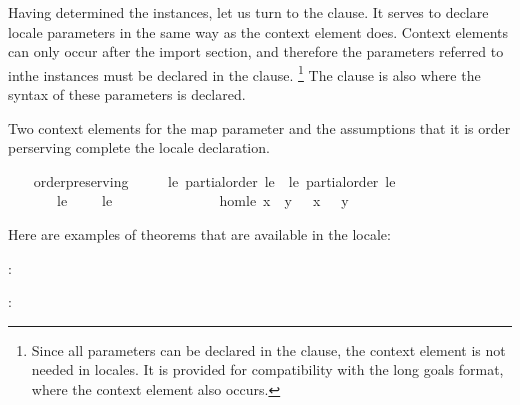 \begin{isabellebody}
\begin{isamarkuptext}
  Having determined the instances, let us turn to the 
  clause.  It serves to declare locale parameters in the same way as
  the context element  does.  Context elements can
  only occur after the import section, and therefore the parameters
  referred to inthe instances must be declared in the 
  clause.%
\footnote{Since all parameters can be declared in the 
  clause, the context element  is not needed in
  locales.  It is provided for compatibility with the long goals
  format, where the context element also occurs.}
  The  clause is also where the syntax of these
  parameters is declared.

  Two context elements for the map parameter \isa{{\isasymphi}} and the
  assumptions that it is order perserving complete the locale
  declaration.%
\end{isamarkuptext}%
\isamarkuptrue%
\ \ \isamarkupfalse%
\ order{\isacharunderscore}preserving\ {\isacharequal}\isanewline
\ \ \ \ le{\isacharcolon}\ partial{\isacharunderscore}order\ le\ {\isacharplus}\ le{\isacharprime}{\isacharcolon}\ partial{\isacharunderscore}order\ le{\isacharprime}\isanewline
\ \ \ \ \ \ \ le\ {\isacharparenleft}\ {\isachardoublequoteopen}{\isasymsqsubseteq}{\isachardoublequoteclose}\ {}{}{\isacharparenright}\ \ le{\isacharprime}\ {\isacharparenleft}\ {\isachardoublequoteopen}{\isasympreceq}{\isachardoublequoteclose}\ {}{}{\isacharparenright}\ {\isacharplus}\isanewline
\ \ \ \ \ {\isasymphi}\isanewline
\ \ \ \ \ hom{\isacharunderscore}le{\isacharcolon}\ {\isachardoublequoteopen}x\ {\isasymsqsubseteq}\ y\ {\isasymLongrightarrow}\ {\isasymphi}\ x\ {\isasympreceq}\ {\isasymphi}\ y{\isachardoublequoteclose}%
\begin{isamarkuptext}%
Here are examples of theorems that are
  available in the locale:

  : 

  : 


\end{isamarkuptext}
\end{isabellebody}

